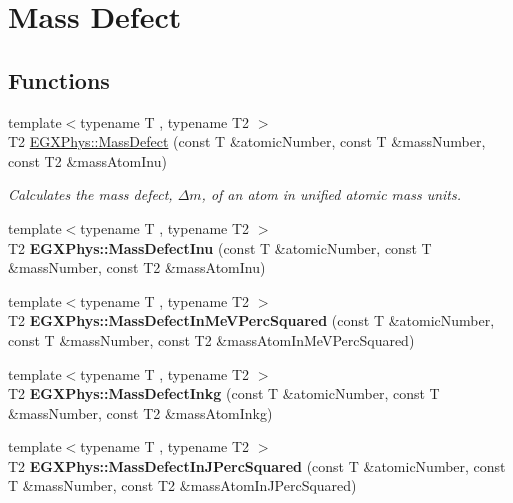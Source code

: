\hypertarget{group___mass_defect}{}\section{Mass Defect}
\label{group___mass_defect}
\subsection*{Functions}
\begin{DoxyCompactItemize}
\item 
{\footnotesize template$<$typename T , typename T2 $>$ }\\T2 \hyperlink{group___mass_defect_gae89f2dfa65992c0314adc2440b2f582a}{E\+G\+X\+Phys\+::\+Mass\+Defect} (const T \&atomic\+Number, const T \&mass\+Number, const T2 \&mass\+Atom\+Inu)
\begin{DoxyCompactList}\small\item\em Calculates the mass defect, $\Delta m$, of an atom in unified atomic mass units. \end{DoxyCompactList}\item 
\mbox{\label{group___mass_defect_ga70400004a5cb622de372ab84670731ef}} 
{\footnotesize template$<$typename T , typename T2 $>$ }\\T2 {\bfseries E\+G\+X\+Phys\+::\+Mass\+Defect\+Inu} (const T \&atomic\+Number, const T \&mass\+Number, const T2 \&mass\+Atom\+Inu)
\item 
\mbox{\label{group___mass_defect_gab51169bf871d0ea0ee0642fa300228fe}} 
{\footnotesize template$<$typename T , typename T2 $>$ }\\T2 {\bfseries E\+G\+X\+Phys\+::\+Mass\+Defect\+In\+Me\+V\+Perc\+Squared} (const T \&atomic\+Number, const T \&mass\+Number, const T2 \&mass\+Atom\+In\+Me\+V\+Perc\+Squared)
\item 
\mbox{\label{group___mass_defect_gad5378933021e13598a76bd8581b1e887}} 
{\footnotesize template$<$typename T , typename T2 $>$ }\\T2 {\bfseries E\+G\+X\+Phys\+::\+Mass\+Defect\+Inkg} (const T \&atomic\+Number, const T \&mass\+Number, const T2 \&mass\+Atom\+Inkg)
\item 
\mbox{\label{group___mass_defect_ga08cff1dfa3259af8f1b67ec741796e91}} 
{\footnotesize template$<$typename T , typename T2 $>$ }\\T2 {\bfseries E\+G\+X\+Phys\+::\+Mass\+Defect\+In\+J\+Perc\+Squared} (const T \&atomic\+Number, const T \&mass\+Number, const T2 \&mass\+Atom\+In\+J\+Perc\+Squared)
\end{DoxyCompactItemize}


